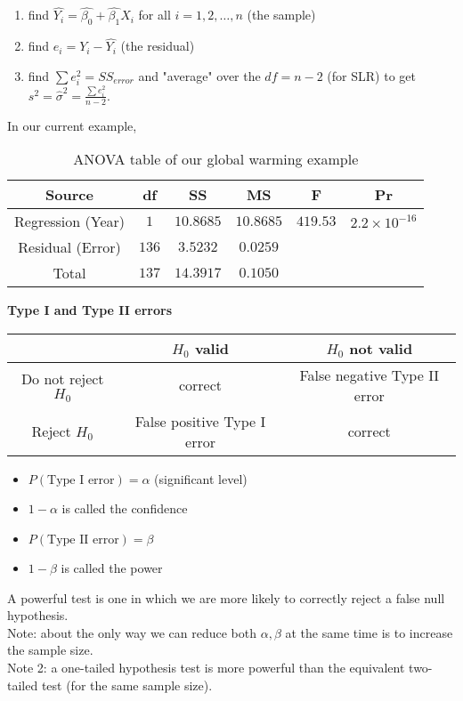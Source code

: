 \documentclass[a4paper, 11pt, twoside]{article}
\begin{document}
\begin{enumerate}
	\item find $\hat{Y_i} =\hat{\beta_0} + \hat{\beta_1}X_i$ for all $i=1, 2, \dots, n$ (the sample)
	\item find $e_i=Y_i - \hat{Y_i}$ (the residual)
	\item find $\sum e_i^2 = SS_{error}$ and "average" over the $df = n-2$ (for SLR) to get $s^2 = \hat{\sigma}^2 = \frac{\sum e_i^2}{n-2}.$
\end{enumerate} 

In our current example,

\begin{table}[htbp!]
		\centering
		\begin{tabular}{|c|c|c|c|c|c|}
			\hline
			Source & df & SS & MS & F & Pr \\
			\hline
			Regression (Year) & $1$ & $10.8685$ & $10.8685$ & $419.53$ & $2.2\times 10^{-16}$\\
			\hline
			Residual (Error) & $136$ & $3.5232$ & $0.0259$ & &\\
			\hline
			Total & $137$ & $14.3917$ & $0.1050$ & &\\
			\hline
		\end{tabular}
		\caption{ANOVA table of our global warming example}
\end{table}


\textbf{Type I and Type II errors}
\begin{table}[htbp!]
	\centering
	\begin{tabular}{|c|c|c|}
		\hline
		 & $H_0$ valid & $H_0$ not valid \\
		\hline
		Do not reject $H_0$ & correct & False negative Type II error \\
		\hline
		Reject $H_0$ & False positive Type I error & correct \\ 
		\hline
	\end{tabular}	
\end{table}

\begin{itemize}
	\item $P(\text{Type I error}) = \alpha$ (significant level)
	\item $1-\alpha$ is called the confidence
	\item $P(\text{Type II error}) = \beta$
	\item $1-\beta$ is called the power
\end{itemize}

A powerful test is one in which we are more likely to correctly reject a false null hypothesis.\\

Note: about the only way we can reduce both $\alpha, \beta$ at the same time is to increase the sample size.\\

Note 2: a one-tailed hypothesis test is more powerful than the equivalent two-tailed test (for the same sample size). 
\end{document}
